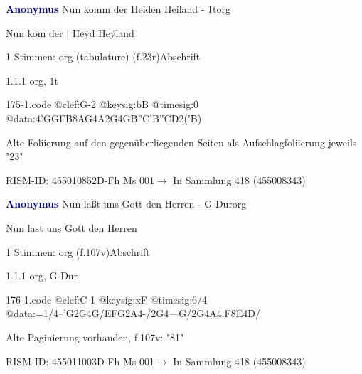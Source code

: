 \documentclass[twocolumn, 12pt]{book}
\begin{document}
\par \vspace{16pt} \textcolor{darkblue}{\textbf{Anonymus  }}\hfillplus{\textbf{[175]}}\newline Nun komm der Heiden Heiland - 1t\newline org
\par \begin{itshape}[f.23r, at left:] Nun kom der | Heÿd Heÿland\end{itshape} 
\par \textcolor{darkblue}{}  1 Stimmen: org (tabulature)  (f.23r)\newline Abschrift
\par 1.1.1  org, 1t  
\begin{filecontents*}{175-1.code}
@clef:G-2
@keysig:bB
@timesig:0
@data:4'GGFB{8AG}4A2G4GB''C'B''CD2('B)
\end{filecontents*}
\newline %
\par Alte Foliierung auf den gegenüberliegenden Seiten als Aufschlagfoliierung jeweils "23"
\par RISM-ID: 455010852\newline D-Fh  Ms 001\newline $\rightarrow$ In Sammlung 418 (455008343)
      
\par \vspace{16pt} \textcolor{darkblue}{\textbf{Anonymus  }}\hfillplus{\textbf{[176]}}\newline Nun laßt uns Gott den Herren - G-Dur\newline org
\par \begin{itshape}[f.107v, heading:] Nun last uns Gott den Herren\end{itshape} 
\par \textcolor{darkblue}{}  1 Stimmen: org  (f.107v)\newline Abschrift
\par 1.1.1  org, G-Dur  
\begin{filecontents*}{176-1.code}
@clef:C-1
@keysig:xF
@timesig:6/4
@data:=1/4--'G2G4G/EFG2A4-/2G4---G/2G4A4.F8E4D/
\end{filecontents*}
\newline %
\par Alte Paginierung vorhanden, f.107v: "81"
\par RISM-ID: 455011003\newline D-Fh  Ms 001\newline $\rightarrow$ In Sammlung 418 (455008343)
      
\end{document}

